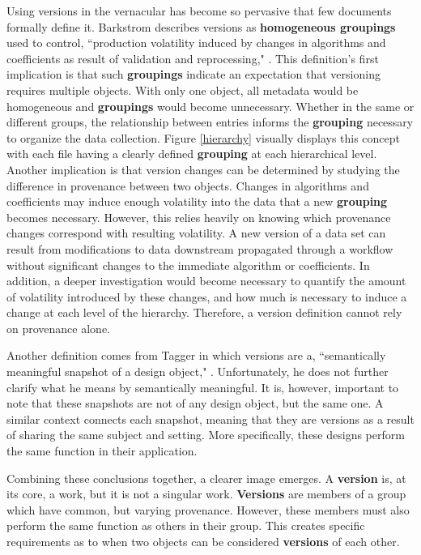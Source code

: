 Using versions in the vernacular has become so pervasive that few documents formally define it.
Barkstrom describes versions as \textbf{homogeneous groupings} used to control, ``production volatility induced by changes in algorithms and coefficients as result of validation and reprocessing," \cite{Barkstrom2003}.
This definition's first implication is that such \textbf{groupings} indicate an expectation that versioning requires multiple objects.
With only one object, all metadata would be homogeneous and \textbf{groupings} would become unnecessary.
Whether in the same or different groups, the relationship between entries informs the \textbf{grouping} necessary to organize the data collection.
Figure \ref{hierarchy} visually displays this concept with each file having a clearly defined \textbf{grouping} at each hierarchical level.
Another implication is that version changes can be determined by studying the difference in provenance between two objects.
Changes in algorithms and coefficients may induce enough volatility into the data that a new \textbf{grouping} becomes necessary.
However, this relies heavily on knowing which provenance changes correspond with resulting volatility.
A new version of a data set can result from modifications to data downstream propagated through a workflow without significant changes to the immediate algorithm or coefficients.
In addition, a deeper investigation would become necessary to quantify the amount of volatility introduced by these changes, and how much is necessary to induce a change at each level of the hierarchy.
Therefore, a version definition cannot rely on provenance alone.

Another definition comes from Tagger in which versions are a, ``semantically meaningful snapshot of a design object," \cite{Tagger2005}.
Unfortunately, he does not further clarify what he means by semantically meaningful.
It is, however, important to note that these snapshots are not of any design object, but the same one.
A similar context connects each snapshot, meaning that they are versions as a result of sharing the same subject and setting.
More specifically, these designs perform the same function in their application.

Combining these conclusions together, a clearer image emerges.
A \textbf{version} is, at its core, a work, but it is not a singular work.
\textbf{Versions} are members of a group which have common, but varying provenance.
However, these members must also perform the same function as others in their group.
This creates specific requirements as to when two objects can be considered \textbf{versions} of each other.

